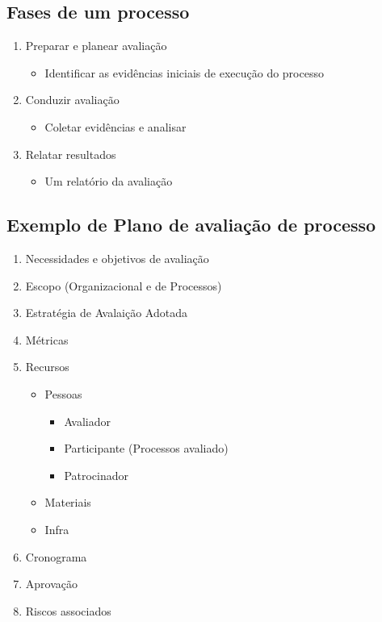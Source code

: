 \documentclass{article}
\begin{document}
\subsection{Fases de um processo}
	\begin{enumerate}
	
	\item Preparar e planear avaliação
		\begin{itemize}
		\item Identificar as evidências iniciais de execução do processo
		\end{itemize}	
	\item Conduzir avaliação
		\begin{itemize}
		\item Coletar evidências e analisar
		\end{itemize}		
	\item Relatar resultados
		\begin{itemize}
		\item Um relatório da avaliação
		\end{itemize}
	\end{enumerate}

\subsection{Exemplo de Plano de avaliação de processo}
	\begin{enumerate}
	\item Necessidades e objetivos de avaliação
	\item Escopo (Organizacional e de Processos)
	\item Estratégia de Avalaição Adotada
	\item Métricas
	\item Recursos
		\begin{itemize}
		\item Pessoas
			\begin{itemize}
			\item Avaliador
			\item Participante (Processos avaliado)
			\item Patrocinador
			\end{itemize}
		\item Materiais
		\item Infra
		\end{itemize}
	\item Cronograma
	\item Aprovação
	\item Riscos associados
	\end{enumerate}
\end{document}
